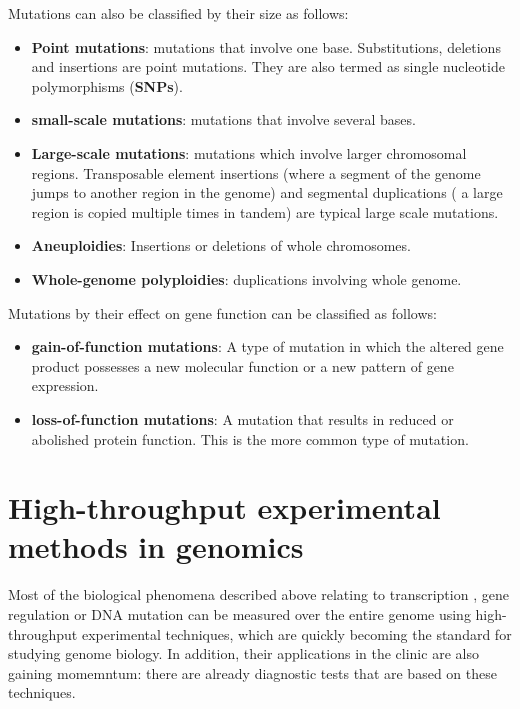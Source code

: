 \documentclass[12pt,]{krantz}
\providecommand{\tightlist}{%
  \setlength{\itemsep}{0pt}\setlength{\parskip}{0pt}}
\begin{document}
Mutations can also be classified by their size as follows:

\begin{itemize}
\tightlist
\item
  \textbf{Point mutations}: mutations that involve one base. Substitutions, deletions and
  insertions are point mutations. They are also termed as single nucleotide
  polymorphisms (\textbf{SNPs}).
\item
  \textbf{small-scale mutations}: mutations that involve several bases.
\item
  \textbf{Large-scale mutations}: mutations which involve larger chromosomal regions.
  Transposable element insertions (where a segment of the genome
  jumps to another region in the genome) and segmental duplications ( a large
  region is copied multiple times in tandem) are typical large scale mutations.
\item
  \textbf{Aneuploidies}: Insertions or deletions of whole chromosomes.
\item
  \textbf{Whole-genome polyploidies}: duplications involving whole genome.
\end{itemize}

Mutations by their effect on gene function can be classified as follows:

\begin{itemize}
\tightlist
\item
  \textbf{gain-of-function mutations}: A type of mutation in which the altered gene
  product possesses a new molecular function or a new pattern of gene
  expression.
\item
  \textbf{loss-of-function mutations}: A mutation that results in reduced or abolished
  protein function. This is the more common type of mutation.
\end{itemize}

\hypertarget{high-throughput-experimental-methods-in-genomics}{%
\section{High-throughput experimental methods in genomics}\label{high-throughput-experimental-methods-in-genomics}}

Most of the biological phenomena described above relating to transcription
, gene regulation or DNA mutation can be measured over the entire genome using
high-throughput experimental techniques, which are quickly becoming
the standard for studying genome biology. In addition, their
applications in the clinic are also gaining momemntum: there are already diagnostic
tests that are based on these techniques.
\end{document}
